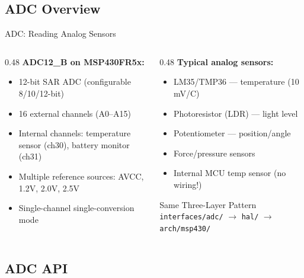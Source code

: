 \documentclass[aspectratio=169, 10pt]{beamer}
\begin{document}
\subsection{ADC Overview}

\begin{frame}[fragile]{ADC: Reading Analog Sensors}
\begin{columns}[T]
\begin{column}{0.48\textwidth}
\textbf{ADC12\_B on MSP430FR5x:}
\begin{itemize}
  \item 12-bit SAR ADC (configurable 8/10/12-bit)
  \item 16 external channels (A0--A15)
  \item Internal channels: temperature sensor (ch30),
        battery monitor (ch31)
  \item Multiple reference sources: AVCC, 1.2V, 2.0V, 2.5V
  \item Single-channel single-conversion mode
\end{itemize}
\end{column}

\begin{column}{0.48\textwidth}
\textbf{Typical analog sensors:}
\begin{itemize}
  \item LM35/TMP36 --- temperature (10\,mV/\textdegree C)
  \item Photoresistor (LDR) --- light level
  \item Potentiometer --- position/angle
  \item Force/pressure sensors
  \item Internal MCU temp sensor (no wiring!)
\end{itemize}

\vspace{0.3em}
\begin{alertblock}{Same Three-Layer Pattern}
\texttt{interfaces/adc/} $\rightarrow$
\texttt{hal/} $\rightarrow$
\texttt{arch/msp430/}
\end{alertblock}
\end{column}
\end{columns}
\end{frame}

\subsection{ADC API}
\end{document}
